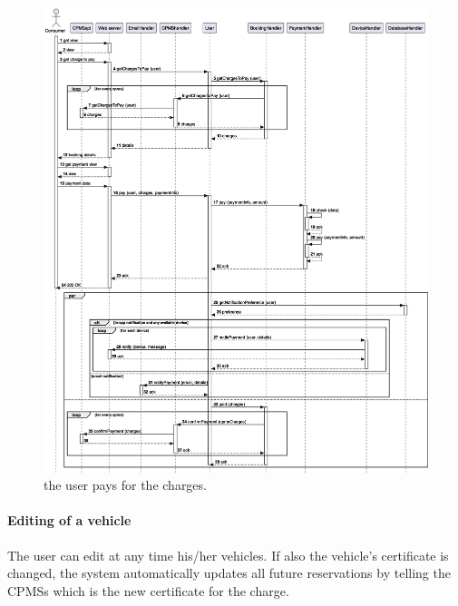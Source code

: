 \begin{figure}[h!]
    \centering
    \includegraphics[width=\columnwidth]{./images/sequences/emsp/payment}
    \caption{the user pays for the charges.}
\end{figure}

\pagebreak

\paragraph{Editing of a vehicle} The user can edit at any time his/her vehicles. If also the vehicle's certificate is changed, the system automatically updates all future reservations by telling the CPMSs which is the new certificate for the charge.

